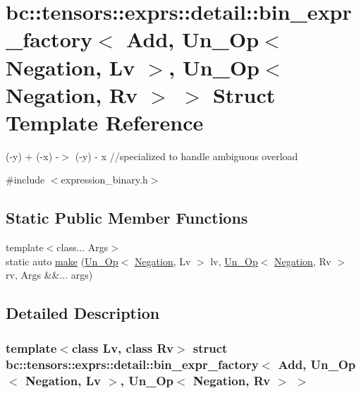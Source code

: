 \hypertarget{structbc_1_1tensors_1_1exprs_1_1detail_1_1bin__expr__factory_3_01Add_00_01Un__Op_3_01Negation_00d86892bae805f04f4b10908e626a3cb5}{}\section{bc\+:\+:tensors\+:\+:exprs\+:\+:detail\+:\+:bin\+\_\+expr\+\_\+factory$<$ Add, Un\+\_\+\+Op$<$ Negation, Lv $>$, Un\+\_\+\+Op$<$ Negation, Rv $>$ $>$ Struct Template Reference}
\label{structbc_1_1tensors_1_1exprs_1_1detail_1_1bin__expr__factory_3_01Add_00_01Un__Op_3_01Negation_00d86892bae805f04f4b10908e626a3cb5}


(-\/y) + (-\/x) -\/$>$ (-\/y) -\/ x //specialized to handle ambiguous overload  




{\ttfamily \#include $<$expression\+\_\+binary.\+h$>$}

\subsection*{Static Public Member Functions}
\begin{DoxyCompactItemize}
\item 
{\footnotesize template$<$class... Args$>$ }\\static auto \hyperlink{structbc_1_1tensors_1_1exprs_1_1detail_1_1bin__expr__factory_3_01Add_00_01Un__Op_3_01Negation_00d86892bae805f04f4b10908e626a3cb5_a4fbf9c3516c874ac3aaa77d22a167694}{make} (\hyperlink{structbc_1_1tensors_1_1exprs_1_1Un__Op}{Un\+\_\+\+Op}$<$ \hyperlink{structbc_1_1oper_1_1Negation}{Negation}, Lv $>$ lv, \hyperlink{structbc_1_1tensors_1_1exprs_1_1Un__Op}{Un\+\_\+\+Op}$<$ \hyperlink{structbc_1_1oper_1_1Negation}{Negation}, Rv $>$ rv, Args \&\&... args)
\end{DoxyCompactItemize}


\subsection{Detailed Description}
\subsubsection*{template$<$class Lv, class Rv$>$\newline
struct bc\+::tensors\+::exprs\+::detail\+::bin\+\_\+expr\+\_\+factory$<$ Add, Un\+\_\+\+Op$<$ Negation, Lv $>$, Un\+\_\+\+Op$<$ Negation, Rv $>$ $>$}

